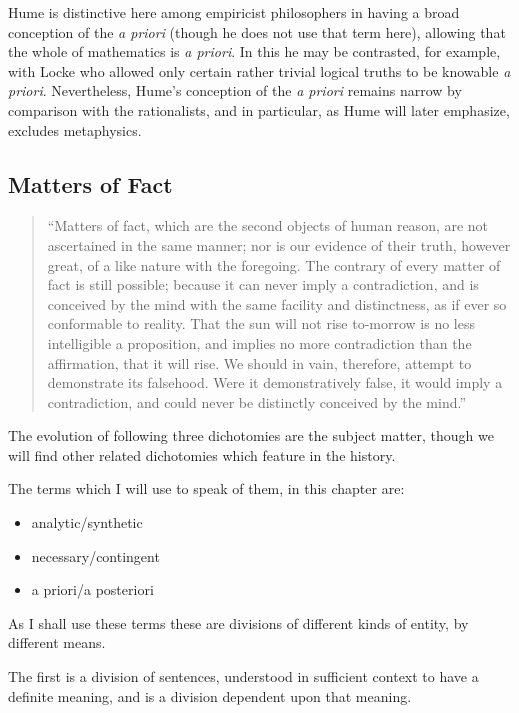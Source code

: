Hume is distinctive here among empiricist philosophers in having a
broad conception of the \emph{a priori} (though he does not use that
term here), allowing that the whole of mathematics is \emph{a priori}.
In this he may be contrasted, for example, with Locke who allowed
only certain rather trivial logical truths to be knowable \emph{a
  priori}.
Nevertheless, Hume's conception of the \emph{a priori} remains narrow
by comparison with the rationalists, and in particular, as Hume will
later emphasize, excludes metaphysics.

\subsection{Matters of Fact}

\begin{quote}
``Matters of fact, which are the second objects of human reason, are not ascertained in the same manner; nor is our evidence of their truth, however great, of a like nature with the foregoing. The contrary of every matter of fact is still possible; because it can never imply a contradiction, and is conceived by the mind with the same facility and distinctness, as if ever so conformable to reality. That the sun will not rise to-morrow is no less intelligible a proposition, and implies no more contradiction than the affirmation, that it will rise. We should in vain, therefore, attempt to demonstrate its falsehood. Were it demonstratively false, it would imply a contradiction, and could never be distinctly conceived by the mind.''
\end{quote}

The evolution of following three dichotomies are the subject matter,
though we will find other related dichotomies which feature in the
history.

The terms which I will use to speak of them, in this chapter are:
\begin{itemize}
\item{analytic/\-synthetic}
\item{necessary/contingent}
\item{a priori/a posteriori}
\end{itemize}

As I shall use these terms these are divisions of different kinds of
entity, by different means.

The first is a division of sentences, understood in sufficient context
to have a definite meaning, and is a division dependent upon that
meaning.

